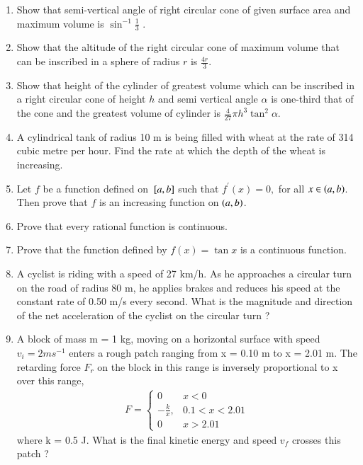 \begin{enumerate}[label=\arabic*.,ref=\thesubsection.\theenumi]
\item  Show that semi-vertical angle of right circular cone of given surface area and maximum volume is $\sin^{-1} \frac{1}{ 3}$
.
\item Show that the altitude of the right circular cone of maximum volume that can be inscribed in a sphere of radius $r$ is $\frac{4r}{ 3}$.
\item Show that height of the cylinder of greatest volume which can be inscribed in a right circular cone of height $h$ and semi vertical angle $\alpha $ is one-third that of the cone and the greatest volume of cylinder is $\frac{4}{27} \pi h^3 \tan^2\alpha $.
\item A cylindrical tank of radius 10 m is being filled with wheat at the rate of 314 cubic metre per hour. Find the rate at which the depth of the wheat is increasing.
\item Let $f$ be a function defined on ${}\left[a,b\right]$ such that $f^{\prime}(x) = 0,$ for all $x \in \left(a,b\right)$.  Then prove that $f$ is an increasing function on $\left(a,b\right)$.
%
\item Prove that every rational function is continuous.
\item Prove that the function defined by $f(x) = \tan x$ is a continuous function.
\item  A cyclist is riding with a speed of 27 km/h. As he approaches a circular turn on the road of radius 80 m, he applies brakes and reduces his speed at the constant rate of 0.50 m/s every second. What is the magnitude and direction of the net acceleration of the cyclist on the circular turn ?
\item A block of mass m = 1 kg, moving on a horizontal surface with speed $v_i
= 2 m s^{-1}$
enters a rough patch ranging from x = 0.10 m to x = 2.01 m. The retarding force $F_r$
on the block in this range is inversely proportional to x over this range,
%
\begin{align}
 F = 
\begin{cases}
 0 & x < 0
\\
-\frac{k}{ x}, & 0.1 < x < 2.01 
\\
0 & x > 2.01 
\end{cases}
\end{align}
%
where k = 0.5 J. What is the final kinetic energy and speed $v_f$
crosses this patch ?
\end{enumerate}
